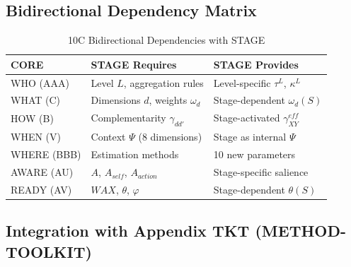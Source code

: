 \subsection{Bidirectional Dependency Matrix}

\begin{table}[htbp]
\centering
\caption{10C Bidirectional Dependencies with STAGE}
\label{tab:10c-dependencies}
\renewcommand{\arraystretch}{1.3}
\footnotesize
\begin{tabular}{@{}lp{4.5cm}p{4.5cm}@{}}
\toprule
\textbf{CORE} & \textbf{STAGE Requires} & \textbf{STAGE Provides} \\
\midrule
WHO (AAA) & Level $L$, aggregation rules & Level-specific $\tau^L$, $\kappa^L$ \\
WHAT (C) & Dimensions $d$, weights $\omega_d$ & Stage-dependent $\omega_d(S)$ \\
HOW (B) & Complementarity $\gamma_{dd'}$ & Stage-activated $\gamma_{XY}^{eff}$ \\
WHEN (V) & Context $\Psi$ (8 dimensions) & Stage as internal $\Psi$ \\
WHERE (BBB) & Estimation methods & 10 new parameters \\
AWARE (AU) & $A$, $A_{self}$, $A_{action}$ & Stage-specific salience \\
READY (AV) & $WAX$, $\theta$, $\varphi$ & Stage-dependent $\theta(S)$ \\
\bottomrule
\end{tabular}
\end{table}

\subsection{Integration with Appendix TKT (METHOD-TOOLKIT)}
\label{sec:aw-hhh-integration}

